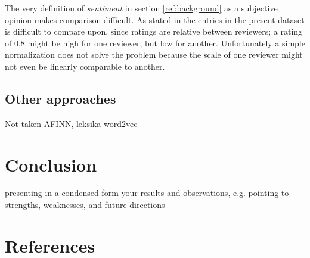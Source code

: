 \documentclass[a4paper]{article}
\begin{document}
The very definition of \textit{sentiment} in section \ref{ref:background} as
a subjective opinion makes comparison difficult. As stated in \citep{PangLee2005}
the entries in the present dataset is difficult to compare upon, since ratings
are relative between reviewers; a rating of 0.8 might be high for one reviewer,
but low for another. Unfortunately a simple normalization does not solve the
problem because the scale of one reviewer might not even be linearly
comparable to another.

\subsection{Other approaches}
Not taken
AFINN, leksika
word2vec
\cite{IMM2011-06010}

\section{Conclusion}
presenting in a condensed form your results and observations, e.g.
pointing to strengths, weaknesses, and future directions

\clearpage%
\renewcommand*{\refname}{}
\section{References}



\end{document}
